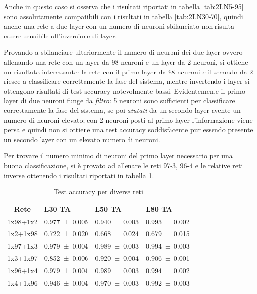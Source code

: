 \documentclass{article}
\begin{document}
Anche in questo caso si osserva che i risultati riportati in tabella \ref{tab:2LN5-95} sono assolutamente compatibili con i risultati in tabella \ref{tab:2LN30-70}, quindi anche una rete a due layer con un numero di neuroni sbilanciato non risulta essere sensibile all'inversione di layer.

Provando a sbilanciare ulteriormente il numero di neuroni dei due layer ovvero allenando una rete con un layer da 98 neuroni e un layer da 2 neuroni, si ottiene un risultato interessante: la rete con il primo layer da 98 neuroni e il secondo da 2 riesce a classificare correttamente la fase del sistema, mentre invertendo i layer si ottengono risultati di test accuracy notevolmente bassi. Evidentemente il primo layer di due neuroni funge da \emph{filtro}: 5 neuroni sono sufficienti per classificare correttamente la fase del sistema, se poi \emph{aiutati} da un secondo layer avente un numero di neuroni elevato; con 2 neuroni posti al primo layer l'informazione viene persa e quindi non si ottiene una test accuracy soddisfacente pur essendo presente un secondo layer con un elevato numero di neuroni. 

Per trovare il numero minimo di neuroni del primo layer necessario per una buona classificazione, si è provato ad allenare le reti 97-3, 96-4 e le relative reti inverse ottenendo i risultati riportati in tabella \ref{tab:2LN2-3-4}.

\begin{table}[ht]
\begin{center}
\begin{tabular}{clll}
\toprule
Rete & L30 TA & L50 TA & L80 TA \\
\midrule
1x98+1x2 & \num{0.977 \pm 0.005} & \num{0.940\pm0.003} & \num{0.993 \pm0.002}\\
1x2+1x98 & \num{0.722 \pm 0.020} & \num{0.668\pm0.024} & \num{0.679 \pm0.015}\\
\midrule
1x97+1x3 & \num{0.979 \pm 0.004} & \num{0.989\pm0.003} & \num{0.994\pm0.003}\\
1x3+1x97 & \num{0.852 \pm 0.006} & \num{0.920\pm0.004} & \num{0.906\pm0.001}\\
\midrule
1x96+1x4 & \num{0.979 \pm 0.004} & \num{0.989\pm0.003} & \num{0.994\pm0.002}\\
1x4+1x96 & \num{0.946 \pm 0.004} & \num{0.970\pm0.003} & \num{0.992\pm0.003}\\
\bottomrule
\end{tabular}
\end{center}
\caption{Test accuracy per diverse reti}
\label{tab:2LN2-3-4}
\end{table}
\end{document}
